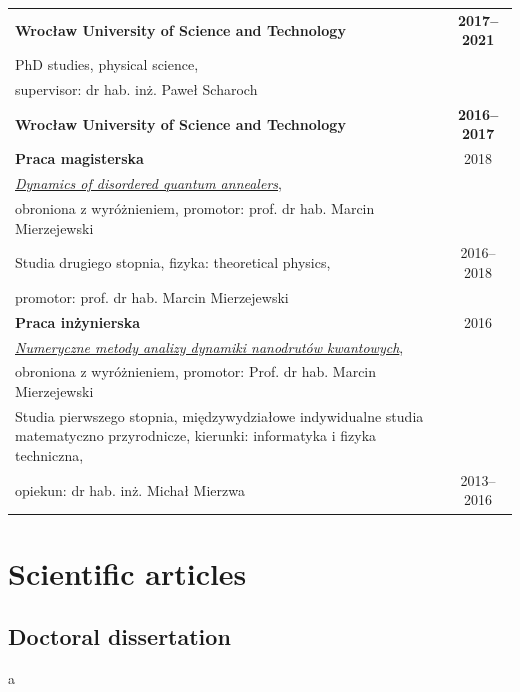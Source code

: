 \noindent
\begin{tabular}{p{12cm}c}
\textbf{Wrocław University of Science and Technology} & \textbf{2017--2021} \\[1ex]
PhD studies, physical science,\\ supervisor: dr hab. inż. Paweł Scharoch\\[3ex]
\textbf{Wrocław University of Science and Technology} & \textbf{2016--2017}\\[1ex]
\textbf{Praca magisterska} & 2018\\
\href{https://andywiecko.github.io/assets/msc_thesis.pdf}{\textit{Dynamics of disordered quantum annealers}},\\ obroniona z wyróżnieniem, promotor: prof. dr hab. Marcin Mierzejewski\\[1ex]
Studia drugiego stopnia, fizyka: theoretical physics, & 2016--2018 \\
promotor: prof. dr hab. Marcin Mierzejewski\\[1ex]
\textbf{Praca inżynierska} &  2016\\
\href{https://andywiecko.github.io/assets/beng_thesis.pdf}{\textit{Numeryczne metody analizy dynamiki nanodrutów kwantowych}},\\ obroniona z wyróżnieniem, promotor: Prof. dr hab. Marcin Mierzejewski\\[1ex]
Studia pierwszego stopnia,  międzywydziałowe indywidualne studia matematyczno przyrodnicze, kierunki: informatyka i fizyka techniczna,\\ opiekun: dr hab. inż. Michał Mierzwa  & 2013--2016 \\
\end{tabular}

\ornament

\newpage
 
\section*{Scientific articles} 
\subsection*{Doctoral dissertation}

\phantom a
\vspace{-10ex}

